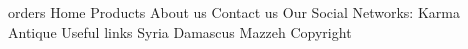 orders
Home
Products
About us
Contact us
Our Social Networks:
Karma Antique
Useful links
Syria
Damascus
Mazzeh
Copyright